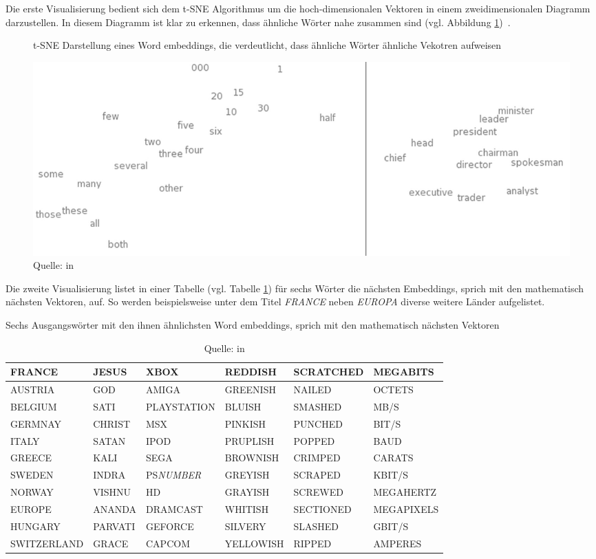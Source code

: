 Die erste Visualisierung bedient sich dem t-SNE Algorithmus um die hoch-dimensionalen Vektoren in einem zweidimensionalen Diagramm darzustellen. In diesem Diagramm ist klar zu erkennen, dass ähnliche Wörter nahe zusammen sind (vgl. Abbildung \ref{wordembeddingtsne})~\autocite{Olah2014b}.
\begin{figure}[h]
    \centering
    \caption{t-SNE Darstellung eines Word embeddings, die verdeutlicht, dass ähnliche Wörter ähnliche Vekotren aufweisen}
    \includegraphics[width=\textwidth]{graphics/wordmebeddingtsne.jpg}
    \caption*{Quelle: \textcite{Turian2010} in \textcite{Olah2014b}}
    \label{wordembeddingtsne}
\end{figure}

Die zweite Visualisierung listet in einer Tabelle (vgl. Tabelle \ref{wordembeddingtable}) für sechs Wörter die nächsten Embeddings, sprich mit den mathematisch nächsten Vektoren, auf. So werden beispielsweise unter dem Titel \textit{FRANCE} neben \textit{EUROPA} diverse weitere Länder aufgelistet.
\begin{table}[h]
\centering
    \caption{Sechs Ausgangswörter mit den ihnen ähnlichsten Word embeddings, sprich mit den mathematisch nächsten Vektoren}
    \label{wordembeddingtable}
    \renewcommand{\arraystretch}{1.25}
    \setlength{\tabcolsep}{3pt}
    \small
    \begin{tabular}{ | l | l | l | l | l | l |}
    \hline
    \rowcolor{ccc} FRANCE & JESUS & XBOX & REDDISH & SCRATCHED & MEGABITS \\ \hline
    AUSTRIA & GOD & AMIGA & GREENISH & NAILED & OCTETS \\ \hline
    BELGIUM & SATI & PLAYSTATION & BLUISH & SMASHED & MB/S \\ \hline
    GERMNAY& CHRIST & MSX & PINKISH & PUNCHED & BIT/S \\ \hline
    ITALY & SATAN & IPOD & PRUPLISH & POPPED & BAUD \\ \hline
    GREECE & KALI & SEGA & BROWNISH & CRIMPED & CARATS \\ \hline
    SWEDEN & INDRA & PS\textit{NUMBER} & GREYISH & SCRAPED & KBIT/S \\ \hline
    NORWAY & VISHNU & HD & GRAYISH & SCREWED & MEGAHERTZ \\ \hline
    EUROPE & ANANDA & DRAMCAST & WHITISH & SECTIONED & MEGAPIXELS \\ \hline
    HUNGARY & PARVATI & GEFORCE & SILVERY & SLASHED & GBIT/S \\ \hline
    SWITZERLAND & GRACE & CAPCOM & YELLOWISH & RIPPED & AMPERES \\ \hline
    \end{tabular}
    \caption*{Quelle: \textcite{Collobert2011} in \textcite{Olah2014b}}
\end{table}

